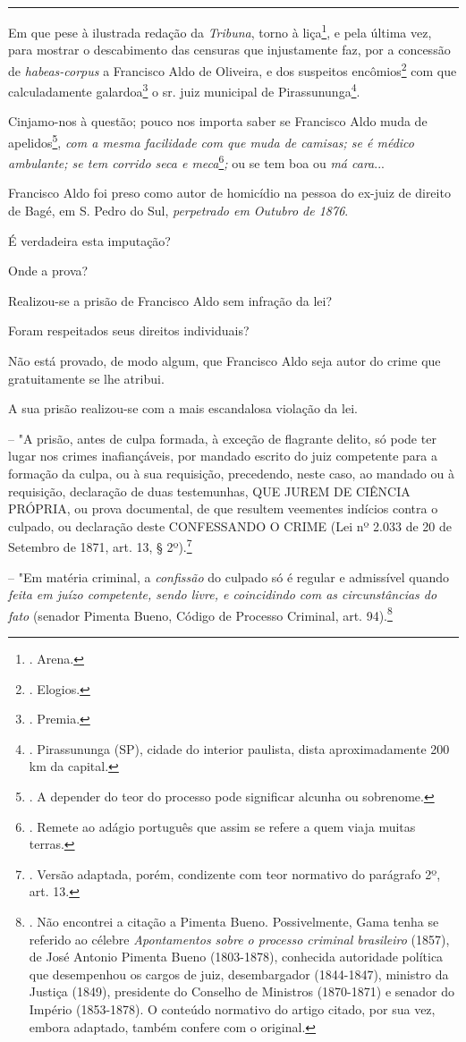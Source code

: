 \begin{center}\rule{0.5\linewidth}{\linethickness}\end{center}

Em que pese à ilustrada redação da \emph{Tribuna}, torno à
liça\footnote{. Arena.}, e pela última vez, para mostrar o descabimento
das censuras que injustamente faz, por a concessão de
\emph{habeas-corpus} a Francisco Aldo de Oliveira, e dos suspeitos
encômios\footnote{. Elogios.} com que calculadamente galardoa\footnote{.
  Premia.} o sr. juiz municipal de Pirassununga\footnote{. Pirassununga
  (SP), cidade do interior paulista, dista aproximadamente 200 km da
  capital.}.

Cinjamo-nos à questão; pouco nos importa saber se Francisco Aldo muda de
apelidos\footnote{. A depender do teor do processo pode significar
  alcunha ou sobrenome.}, \emph{com a mesma facilidade com que muda de
camisas; se é médico ambulante; se tem corrido seca e meca}\footnote{.
  Remete ao adágio português que assim se refere a quem viaja muitas
  terras.}\emph{;} ou se tem boa ou \emph{má cara}...

Francisco Aldo foi preso como autor de homicídio na pessoa do ex-juiz de
direito de Bagé, em S. Pedro do Sul, \emph{perpetrado em Outubro de
1876}.

É verdadeira esta imputação?

Onde a prova?

Realizou-se a prisão de Francisco Aldo sem infração da lei?

Foram respeitados seus direitos individuais?

Não está provado, de modo algum, que Francisco Aldo seja autor do crime
que gratuitamente se lhe atribui.

A sua prisão realizou-se com a mais escandalosa violação da lei.

-- "A prisão, antes de culpa formada, à exceção de flagrante delito, só
pode ter lugar nos crimes inafiançáveis, por mandado escrito do juiz
competente para a formação da culpa, ou à sua requisição, precedendo,
neste caso, ao mandado ou à requisição, declaração de duas testemunhas,
QUE JUREM DE CIÊNCIA PRÓPRIA, ou prova documental, de que resultem
veementes indícios contra o culpado, ou declaração deste CONFESSANDO O
CRIME (Lei nº 2.033 de 20 de Setembro de 1871, art. 13, § 2º).\footnote{.
  Versão adaptada, porém, condizente com teor normativo do parágrafo 2º,
  art. 13.}

-- "Em matéria criminal, a \emph{confissão} do culpado só é regular e
admissível quando \emph{feita em juízo competente, sendo livre, e
coincidindo com as circunstâncias do fato} (senador Pimenta Bueno,
Código de Processo Criminal, art. 94).\footnote{. Não encontrei a
  citação a Pimenta Bueno. Possivelmente, Gama tenha se referido ao
  célebre \emph{Apontamentos sobre o processo criminal brasileiro}
  (1857), de José Antonio Pimenta Bueno (1803-1878), conhecida
  autoridade política que desempenhou os cargos de juiz, desembargador
  (1844-1847), ministro da Justiça (1849), presidente do Conselho de
  Ministros (1870-1871) e senador do Império (1853-1878). O conteúdo
  normativo do artigo citado, por sua vez, embora adaptado, também
  confere com o original.}

